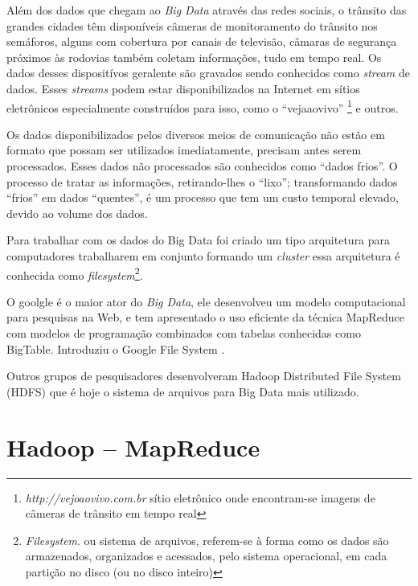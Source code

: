 \documentclass[conference,compsoc]{IEEEtran}
\begin{document}
Além dos dados que chegam ao \textit{Big Data} através das redes sociais, o trânsito das grandes cidades têm disponíveis câmeras de monitoramento do trânsito nos semáforos, alguns com cobertura
por canais de televisão, câmaras de segurança próximos às rodovias também coletam informações, tudo em tempo real. Os dados desses dispositívos geralente são gravados sendo conhecidos como \textit{stream} de dados. 
Esses \textit{streams} podem estar disponibilizados na Internet em sítios eletrônicos especialmente construídos para isso, como o ``vejaaovivo''
\footnote{\textit{http://vejoaovivo.com.br} sítio eletrônico onde encontram-se imagens de câmeras de trânsito em tempo real} e outros.

Os dados disponibilizados pelos diversos meios de comunicação não estão em formato que possam ser utilizados imediatamente, precisam antes serem processados. Esses dados não processados são conhecidos como ``dados frios''.
O processo de tratar as informações, retirando-lhes o ``lixo''; transformando dados ``frios'' em dados ``quentes'', é um processo que tem um custo temporal elevado, devido ao volume dos dados.

Para trabalhar com os dados do Big Data foi criado um tipo arquitetura para computadores trabalharem em conjunto formando um \textit{cluster} essa arquitetura é conhecida como \textit{filesystem}\footnote{\textit{Filesystem}. ou sistema de arquivos, referem-se à forma como os dados são armazenados, organizados e acessados, pelo sistema operacional, em cada partição no disco (ou no disco inteiro)}.

O goolgle é o maior ator do \textit{Big Data}, ele desenvolveu um modelo computacional para pesquisas na Web, e tem apresentado o uso eficiente da técnica MapReduce com modelos de programação combinados com tabelas conhecidas como BigTable. Introduziu o Google File System \cite{Filesystem}. 

Outros grupos de pesquisadores desenvolveram Hadoop Distributed File System (HDFS) que é hoje o sistema de arquivos para Big Data mais utilizado.\cite{Lange2015}


\section{Hadoop -- MapReduce}
\end{document}
